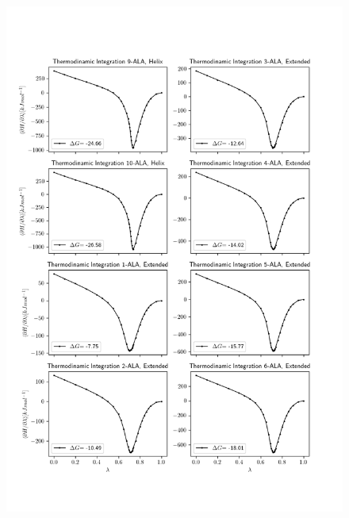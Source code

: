 \begin{figure}[h]
    \centering
    \includegraphics[scale=0.75]{Figures/Chapter_7/TI_curves_2.png}
    \label{fig:my_label}
\end{figure}
